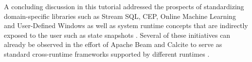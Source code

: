 A concluding discussion in this tutorial addressed the prospects of standardizing domain-specific libraries such as Stream SQL, CEP, Online Machine Learning and User-Defined Windows \cite{carbone2015cutty} as well as system runtime concepts that are indirectly exposed to the user such as state snapshots \cite{state2017carbone}. Several of these initiatives can already be observed in the effort of Apache Beam \cite{CUSTOM:web/beam} and Calcite \cite{CUSTOM:web/calcite} to serve as standard cross-runtime frameworks supported by different runtimes \cite{CUSTOM:web/beamcapabilitymatrix}.
